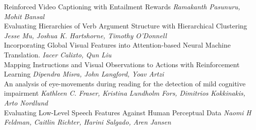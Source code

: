 \documentclass{book}
\begin{document}
    \noindent	Reinforced Video Captioning with Entailment Rewards \newline 
    {\itshape Ramakanth Pasunuru, Mohit Bansal} \\
    
    \noindent	Evaluating Hierarchies of Verb Argument Structure with Hierarchical Clustering \newline 
    {\itshape Jesse Mu, Joshua K. Hartshorne, Timothy O'Donnell} \\
    
    \noindent	Incorporating Global Visual Features into Attention-based Neural Machine Translation. \newline 
    {\itshape Iacer Calixto, Qun Liu} \\
    
    \noindent	Mapping Instructions and Visual Observations to Actions with Reinforcement Learning \newline 
    {\itshape Dipendra Misra, John Langford, Yoav Artzi} \\
    
    \noindent	An analysis of eye-movements during reading for the detection of mild cognitive impairment \newline 
    {\itshape Kathleen C. Fraser, Kristina Lundholm Fors, Dimitrios Kokkinakis, Arto Nordlund} \\
    
    \noindent	Evaluating Low-Level Speech Features Against Human Perceptual Data \newline 
    {\itshape Naomi H Feldman, Caitlin Richter, Harini Salgado, Aren Jansen} \\
    
\vspace*{\fill}
\end{document}
